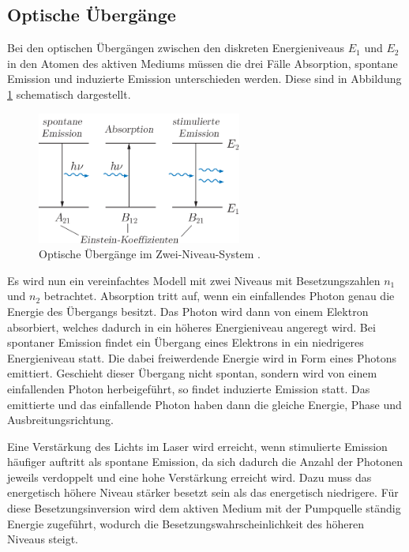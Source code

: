 \subsection*{Optische Übergänge}
Bei den optischen Übergängen zwischen den diskreten Energieniveaus $E_1$ und $E_2$ in den Atomen des aktiven Mediums
müssen die drei Fälle Absorption, spontane Emission und induzierte Emission unterschieden werden. Diese sind in 
Abbildung \ref{fig:tfig1} schematisch dargestellt.
\FloatBarrier
    \begin{figure}[h]
    \centering
    \includegraphics[width=0.6\textwidth]{optisch.png}
    \caption{Optische Übergänge im Zwei-Niveau-System \cite{quelle05}.}
    \label{fig:tfig1}
    \end{figure}
\FloatBarrier
\noindent
Es wird nun ein vereinfachtes Modell mit zwei Niveaus mit Besetzungszahlen $n_1$ und $n_2$ betrachtet. 
Absorption tritt auf, wenn ein einfallendes Photon genau die Energie des Übergangs besitzt. Das Photon wird dann von einem
Elektron absorbiert, welches dadurch in ein höheres Energieniveau angeregt wird.
Bei spontaner Emission findet ein Übergang eines Elektrons in ein niedrigeres Energieniveau statt. Die dabei freiwerdende
Energie wird in Form eines Photons emittiert. Geschieht dieser Übergang nicht spontan, sondern wird von einem einfallenden 
Photon herbeigeführt, so findet induzierte Emission statt. Das emittierte und das einfallende Photon haben dann die gleiche
Energie, Phase und Ausbreitungsrichtung.

Eine Verstärkung des Lichts im Laser wird erreicht, wenn stimulierte Emission häufiger auftritt als spontane Emission, 
da sich dadurch die Anzahl der Photonen jeweils verdoppelt und eine hohe Verstärkung erreicht wird. 
Dazu muss das energetisch höhere Niveau stärker besetzt sein als das energetisch niedrigere. Für diese
Besetzungsinversion wird dem aktiven Medium mit der Pumpquelle ständig Energie zugeführt, wodurch die Besetzungswahrscheinlichkeit
des höheren Niveaus steigt. 

